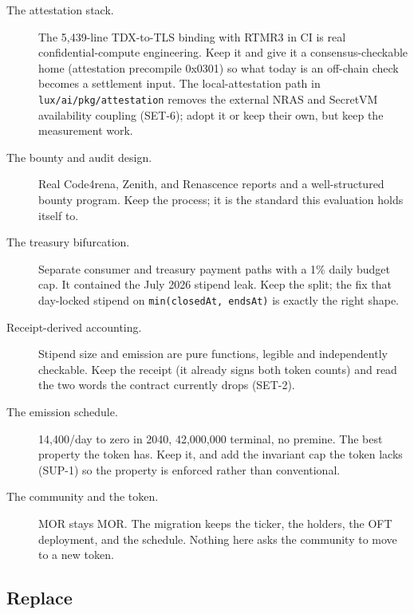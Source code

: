 \documentclass[11pt,a4paper]{article}
\newcommand{\code}[1]{\texttt{\small #1}}
\begin{document}
\begin{description}
  \item[The attestation stack.] The 5,439-line TDX-to-TLS binding with RTMR3 in CI is real
    confidential-compute engineering. Keep it and give it a consensus-checkable home
    (attestation precompile 0x0301) so what today is an off-chain check becomes a settlement
    input. The local-attestation path in \code{lux/ai/pkg/attestation} removes the external
    NRAS and SecretVM availability coupling (SET-6); adopt it or keep their own, but keep the
    measurement work.
  \item[The bounty and audit design.] Real Code4rena, Zenith, and Renascence reports and a
    well-structured bounty program. Keep the process; it is the standard this evaluation holds
    itself to.
  \item[The treasury bifurcation.] Separate consumer and treasury payment paths with a 1\%
    daily budget cap. It contained the July 2026 stipend leak. Keep the split; the fix that
    day-locked stipend on \code{min(closedAt, endsAt)} is exactly the right shape.
  \item[Receipt-derived accounting.] Stipend size and emission are pure functions, legible and
    independently checkable. Keep the receipt (it already signs both token counts) and read the
    two words the contract currently drops (SET-2).
  \item[The emission schedule.] 14,400/day to zero in 2040, 42,000,000 terminal, no premine.
    The best property the token has. Keep it, and add the invariant cap the token lacks (SUP-1)
    so the property is enforced rather than conventional.
  \item[The community and the token.] MOR stays MOR. The migration keeps the ticker, the
    holders, the OFT deployment, and the schedule. Nothing here asks the community to move to a
    new token.
\end{description}

\subsection{Replace}
\end{document}
